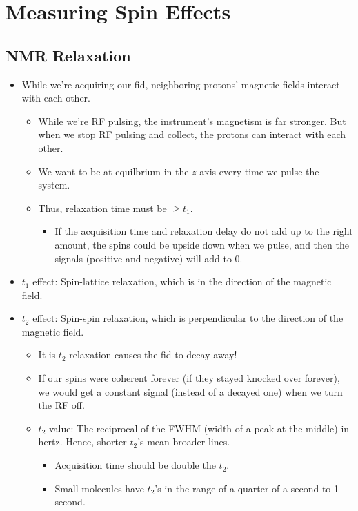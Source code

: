 \documentclass[../notes.tex]{subfiles}
\begin{document}
\chapter{Measuring Spin Effects}
\section{NMR Relaxation}
\begin{itemize}
    \item {}While we're acquiring our fid, neighboring protons' magnetic fields interact with each other.
    \begin{itemize}
        \item While we're RF pulsing, the instrument's magnetism is far stronger. But when we stop RF pulsing and collect, the protons can interact with each other.
        \item We want to be at equilbrium in the $z$-axis every time we pulse the system.
        \item Thus, relaxation time must be $\geq t_1$.
        \begin{itemize}
            \item If the acquisition time and relaxation delay do not add up to the right amount, the spins could be upside down when we pulse, and then the signals (positive and negative) will add to 0.
        \end{itemize}
    \end{itemize}
    \item $t_1$ effect: Spin-lattice relaxation, which is in the direction of the magnetic field.
    \item $t_2$ effect: Spin-spin relaxation, which is perpendicular to the direction of the magnetic field.
    \begin{itemize}
        \item It is $t_2$ relaxation causes the fid to decay away!
        \item If our spins were coherent forever (if they stayed knocked over forever), we would get a constant signal (instead of a decayed one) when we turn the RF off.
        \item $t_2$ value: The reciprocal of the FWHM (width of a peak at the middle) in hertz. Hence, shorter $t_2$'s mean broader lines.
        \begin{itemize}
            \item Acquisition time should be double the $t_2$.
            \item Small molecules have $t_2$'s in the range of a quarter of a second to 1 second.

\end{itemize}
\end{itemize}
\end{itemize}
\end{document}

